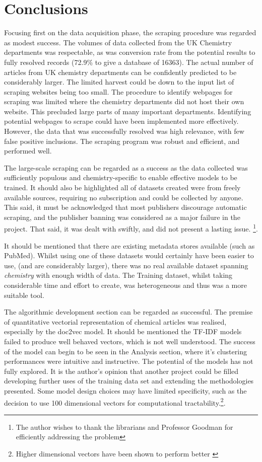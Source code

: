 \chapter{Conclusions}
Focusing first on the data acquisition phase, the scraping procedure was regarded as modest success. The volumes of data collected from the UK Chemistry departments was respectable, as was conversion rate from the potential results to fully resolved records (72.9\%  to give a database of 16363). The actual number of articles from UK chemistry departments can be confidently predicted to be considerably larger. The limited harvest could be down to the input list of scraping websites being too small. The procedure to identify webpages for scraping was limited where the chemistry departments did not host their own website. This  precluded large parts of many important departments. Identifying potential webpages to scrape could have been implemented more effectively.  However, the data that was successfully resolved was high relevance, with few false positive inclusions. The scraping program was robust and efficient, and performed well. 

The large-scale scraping can be regarded as a success as the data collected was sufficiently populous and chemistry-specific  to enable effective models to be trained. It should also be highlighted all of datasets created were from freely available sources, requiring no subscription and could be collected by anyone. This said, it must be acknowledged that most publishers discourage automatic scraping, and the publisher banning was considered as a major failure in the project. That said, it was dealt with swiftly, and did not present a lasting issue. \footnote{The author wishes to thank the librarians and Professor Goodman for efficiently addressing the problem}.

 It should be mentioned that there are existing metadata stores available (such as PubMed). Whilst using one of these datasets would certainly have been easier to use, (and  are considerably larger), there was no real available dataset spanning \emph{chemistry} with enough width of data. The Training dataset, whilst taking considerable time and effort to create, was heterogeneous and thus was a more suitable tool.

The algorithmic development section can be regarded as successful. The premise of quantitative vectorial representation of chemical articles was realised, especially by the doc2vec model. It should be mentioned the TF-IDF models failed to produce well behaved vectors, which is not well understood. The success of the model can begin to be seen in the Analysis section, where it's clustering performances were intuitive and instructive. The potential of the models has not fully explored. It is the author's opinion that another project could be filled developing further uses of the training data set and extending the methodologies presented. 
Some model design choices may have limited specificity, such as the decision to use 100 dimensional vectors for computational tractability.\footnote{Higher dimensional vectors have been shown to perform better \cite{word2vec1}}.

